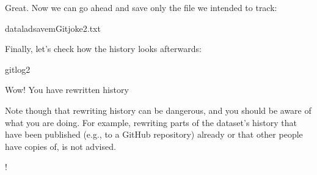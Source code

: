\sphinxAtStartPar
Great. Now we can go ahead and save only the file we intended
to track:

\begin{sphinxVerbatim}[commandchars=\\\{\}]
dataladsave\PYGZhy{}mGitjoke2.txt
\end{sphinxVerbatim}

\sphinxAtStartPar
Finally, let’s check how the history looks afterwards:

\begin{sphinxVerbatim}[commandchars=\\\{\}]
gitlog\PYGZhy{}2



\end{sphinxVerbatim}

\sphinxAtStartPar
Wow! You have rewritten history%
\begin{footnote}\sphinxAtStartFootnote
Note though that rewriting history can be dangerous, and you should
be aware of what you are doing. For example, rewriting parts of the
dataset’s history that have been published (e.g., to a GitHub repository)
already or that other people have copies of, is not advised.
%
\end{footnote}!

\ignorespaces 

